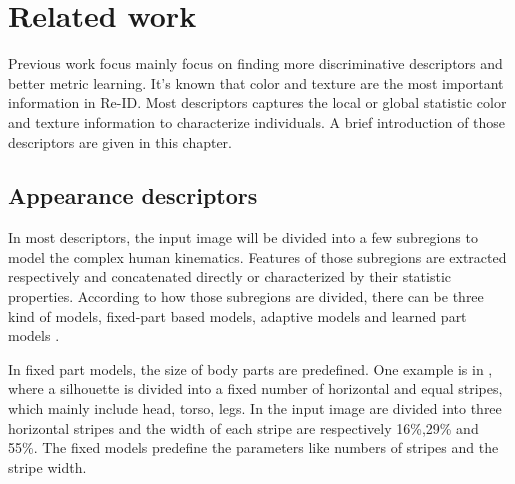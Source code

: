 \chapter{Related work}
Previous work focus mainly focus on finding more discriminative descriptors and better metric learning. It's known that color and texture are the most important information in Re-ID. Most descriptors captures the local or global statistic color and texture information to characterize individuals. A brief introduction of those descriptors are given in this chapter.

\section{Appearance descriptors}
In most descriptors, the input image will be divided into a few subregions to model the complex human kinematics. Features of those subregions are extracted respectively and concatenated directly or characterized by their statistic properties. According to how those subregions are divided, there can be three kind of models, fixed-part based models, adaptive models and learned part models \cite{Appearancedesc}. 

In fixed part models, the size of body parts are predefined. One example is in \cite{}, where a silhouette is divided into a fixed number of horizontal and equal stripes, which mainly include head, torso, legs. In \cite{} the input image are divided into three horizontal stripes and the width of each stripe are respectively 16\%,29\% and 55\%.  The fixed models predefine the parameters like numbers of stripes and the stripe width. 


